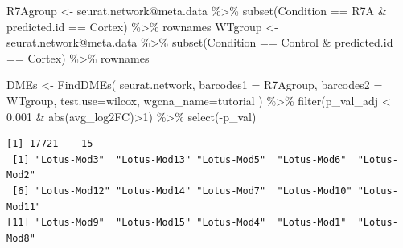 \documentclass[
  letterpaper,
  DIV=11,
  numbers=noendperiod]{scrartcl}
\newenvironment{Shaded}{}{}
\newcommand{\AttributeTok}[1]{\textcolor[rgb]{0.49,0.56,0.16}{#1}}
\newcommand{\DecValTok}[1]{\textcolor[rgb]{0.25,0.63,0.44}{#1}}
\newcommand{\FloatTok}[1]{\textcolor[rgb]{0.25,0.63,0.44}{#1}}
\newcommand{\FunctionTok}[1]{\textcolor[rgb]{0.02,0.16,0.49}{#1}}
\newcommand{\NormalTok}[1]{#1}
\newcommand{\OtherTok}[1]{\textcolor[rgb]{0.00,0.44,0.13}{#1}}
\newcommand{\SpecialCharTok}[1]{\textcolor[rgb]{0.25,0.44,0.63}{#1}}
\newcommand{\StringTok}[1]{\textcolor[rgb]{0.25,0.44,0.63}{#1}}
\begin{document}
\begin{Shaded}
\begin{Highlighting}[]
\NormalTok{R7Agroup }\OtherTok{\textless{}{-}}\NormalTok{ seurat.network}\SpecialCharTok{@}\NormalTok{meta.data }\SpecialCharTok{\%\textgreater{}\%} \FunctionTok{subset}\NormalTok{(Condition }\SpecialCharTok{==} \StringTok{\textquotesingle{}R7A\textquotesingle{}} \SpecialCharTok{\&}\NormalTok{ predicted.id }\SpecialCharTok{==} \StringTok{\textquotesingle{}Cortex\textquotesingle{}}\NormalTok{) }\SpecialCharTok{\%\textgreater{}\%}\NormalTok{ rownames}
\NormalTok{WTgroup }\OtherTok{\textless{}{-}}\NormalTok{ seurat.network}\SpecialCharTok{@}\NormalTok{meta.data }\SpecialCharTok{\%\textgreater{}\%} \FunctionTok{subset}\NormalTok{(Condition }\SpecialCharTok{==} \StringTok{\textquotesingle{}Control\textquotesingle{}} \SpecialCharTok{\&}\NormalTok{ predicted.id }\SpecialCharTok{==} \StringTok{\textquotesingle{}Cortex\textquotesingle{}}\NormalTok{) }\SpecialCharTok{\%\textgreater{}\%}\NormalTok{ rownames}
\end{Highlighting}
\end{Shaded}

\begin{Shaded}
\begin{Highlighting}[]
\NormalTok{DMEs }\OtherTok{\textless{}{-}} \FunctionTok{FindDMEs}\NormalTok{(}
\NormalTok{  seurat.network,}
  \AttributeTok{barcodes1 =}\NormalTok{ R7Agroup,}
  \AttributeTok{barcodes2 =}\NormalTok{ WTgroup,}
  \AttributeTok{test.use=}\StringTok{\textquotesingle{}wilcox\textquotesingle{}}\NormalTok{,}
  \AttributeTok{wgcna\_name=}\StringTok{\textquotesingle{}tutorial\textquotesingle{}}
\NormalTok{) }\SpecialCharTok{\%\textgreater{}\%} \FunctionTok{filter}\NormalTok{(p\_val\_adj }\SpecialCharTok{\textless{}} \FloatTok{0.001} \SpecialCharTok{\&} \FunctionTok{abs}\NormalTok{(avg\_log2FC)}\SpecialCharTok{\textgreater{}}\DecValTok{1}\NormalTok{) }\SpecialCharTok{\%\textgreater{}\%} \FunctionTok{select}\NormalTok{(}\SpecialCharTok{{-}}\NormalTok{p\_val)}
\end{Highlighting}
\end{Shaded}

\begin{verbatim}
[1] 17721    15
 [1] "Lotus-Mod3"  "Lotus-Mod13" "Lotus-Mod5"  "Lotus-Mod6"  "Lotus-Mod2" 
 [6] "Lotus-Mod12" "Lotus-Mod14" "Lotus-Mod7"  "Lotus-Mod10" "Lotus-Mod11"
[11] "Lotus-Mod9"  "Lotus-Mod15" "Lotus-Mod4"  "Lotus-Mod1"  "Lotus-Mod8" 
\end{verbatim}
\end{document}
